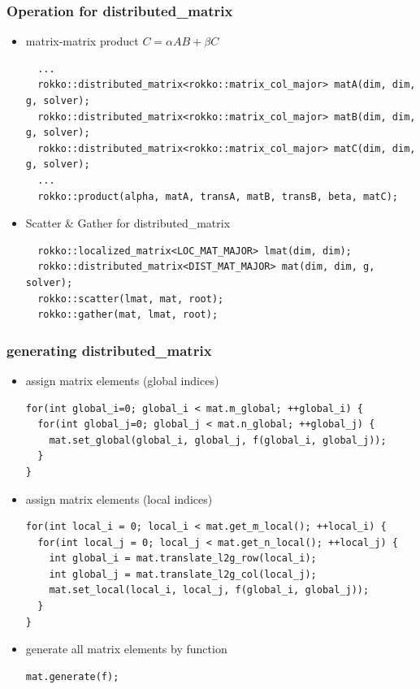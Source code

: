 \begin{frame}[c,fragile]
  \frametitle{Operation for distributed_matrix}
  \begin{itemize}
  \item matrix-matrix product $C = \alpha A B + \beta C$
\begin{lstlisting}
  ...
  rokko::distributed_matrix<rokko::matrix_col_major> matA(dim, dim, g, solver);
  rokko::distributed_matrix<rokko::matrix_col_major> matB(dim, dim, g, solver);
  rokko::distributed_matrix<rokko::matrix_col_major> matC(dim, dim, g, solver);
  ...
  rokko::product(alpha, matA, transA, matB, transB, beta, matC);
\end{lstlisting}
  \item Scatter \& Gather for distributed_matrix
\begin{lstlisting}
  rokko::localized_matrix<LOC_MAT_MAJOR> lmat(dim, dim);
  rokko::distributed_matrix<DIST_MAT_MAJOR> mat(dim, dim, g, solver);
  rokko::scatter(lmat, mat, root);
  rokko::gather(mat, lmat, root);
\end{lstlisting}
  \end{itemize}
\end{frame}

\begin{frame}[c,fragile]
  \frametitle{generating distributed_matrix}
  \begin{itemize}
  \item assign matrix elements (global indices)
\begin{lstlisting}
for(int global_i=0; global_i < mat.m_global; ++global_i) {
  for(int global_j=0; global_j < mat.n_global; ++global_j) {
    mat.set_global(global_i, global_j, f(global_i, global_j));
  }
}
\end{lstlisting}
  \item assign matrix elements (local indices)
\begin{lstlisting}
for(int local_i = 0; local_i < mat.get_m_local(); ++local_i) {
  for(int local_j = 0; local_j < mat.get_n_local(); ++local_j) {
    int global_i = mat.translate_l2g_row(local_i);
    int global_j = mat.translate_l2g_col(local_j);
    mat.set_local(local_i, local_j, f(global_i, global_j));
  }
}
\end{lstlisting}
  \item generate all matrix elements by function
\begin{lstlisting}
mat.generate(f);
\end{lstlisting}
  \end{itemize}
\end{frame}


